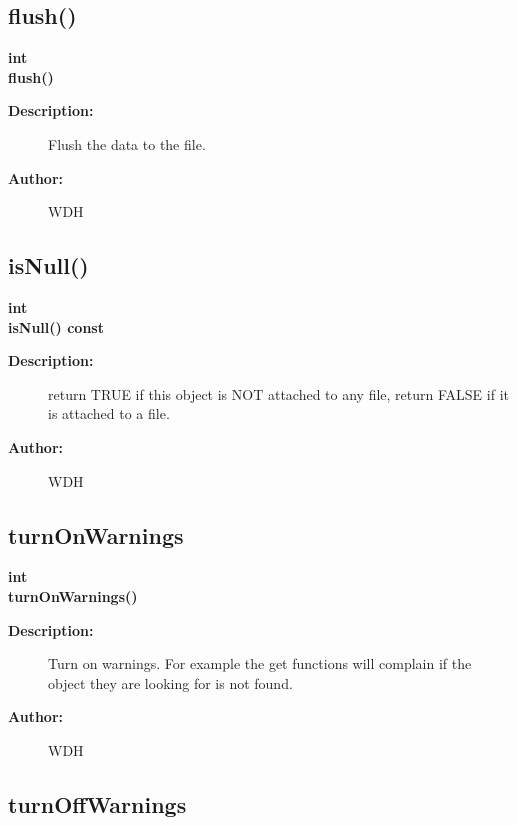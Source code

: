 \subsection{flush()}
 
\begin{flushleft} \textbf{%
int  \\ 
\settowidth{\GenericDataBaseIncludeArgIndent}{flush(}%
flush()
}\end{flushleft}
\begin{description}
\item[{\bf Description:}] 
   Flush the data to the file. 
\item[{\bf Author:}]  WDH

\end{description}
\subsection{isNull()}
 
\begin{flushleft} \textbf{%
int  \\ 
\settowidth{\GenericDataBaseIncludeArgIndent}{isNull(}%
isNull() const
}\end{flushleft}
\begin{description}
\item[{\bf Description:}] 
   return TRUE if this object is NOT attached to any file, return FALSE if it is attached to a file.
\item[{\bf Author:}]  WDH

\end{description}
\subsection{turnOnWarnings}
 
\begin{flushleft} \textbf{%
int  \\ 
\settowidth{\GenericDataBaseIncludeArgIndent}{turnOnWarnings(}%
turnOnWarnings()
}\end{flushleft}
\begin{description}
\item[{\bf Description:}] 
   Turn on warnings. For example the get functions will complain if the object they
 are looking for is not found.
\item[{\bf Author:}]  WDH

\end{description}
\subsection{turnOffWarnings}
 
